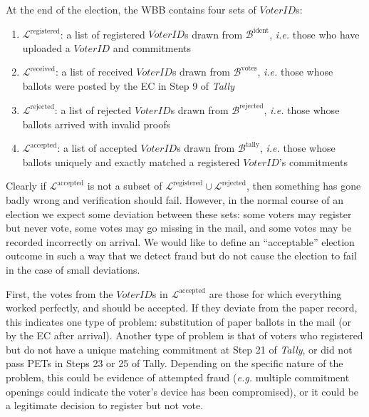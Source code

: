 \documentclass[12pt,a4paper]{article}
\theoremstyle{definition}
\newcommand{\VoterID}{\mathit{VoterID}}
\newcommand{\ie}{\textit{i.e. }}
\newcommand{\eg}{\textit{e.g. }}
\begin{document}
At the end of the election, the WBB contains four sets of $\VoterID$s:
\begin{enumerate}
    \item $\mathcal{L}^{\text{registered}}$: a list of registered $\VoterID$s drawn from $\mathcal{B}^{\text{ident}}$, \ie those who have uploaded a $\VoterID$ and commitments

    \item $\mathcal{L}^{\text{received}}$: a list of received $\VoterID$s drawn from $\mathcal{B}^{\text{votes}}$, \ie those whose ballots were posted by the EC in Step 9 of \textit{Tally}

    \item $\mathcal{L}^{\text{rejected}}$: a list of rejected $\VoterID$s drawn from $\mathcal{B}^{\text{rejected}}$, \ie those whose ballots arrived with invalid proofs

    \item  $\mathcal{L}^{\text{accepted}}$: a list of accepted $\VoterID$s drawn from $\mathcal{B}^{\text{tally}}$, \ie those whose ballots uniquely and exactly matched a registered $\VoterID$'s commitments
\end{enumerate}

Clearly if $\mathcal{L}^{\text{accepted}}$ is not a subset of $\mathcal{L}^{\text{registered}} \cup \mathcal{L}^{\text{rejected}}$, then something has gone badly wrong and verification should fail. However, in the normal course of an election we expect some deviation between these sets: some voters may register but never vote, some votes may go missing in the mail, and some votes may be recorded incorrectly on arrival. We would like to define an ``acceptable'' election outcome in such a way that we detect fraud but do not cause the election to fail in the case of small deviations.

First, the votes from the $\VoterID$s in $\mathcal{L}^{\text{accepted}}$ are those for which everything worked perfectly, and should be accepted. If they deviate from the paper record, this indicates one type of problem: substitution of paper ballots in the mail (or by the EC after arrival). Another type of problem is that of voters who registered but do not have a unique matching commitment at Step 21 of \textit{Tally}, or did not pass PETs in Steps 23 or 25 of Tally. Depending on the specific nature of the problem, this could be evidence of attempted fraud (\eg multiple commitment openings could indicate the voter's device has been compromised), or it could be a legitimate decision to register but not vote.
\end{document}

